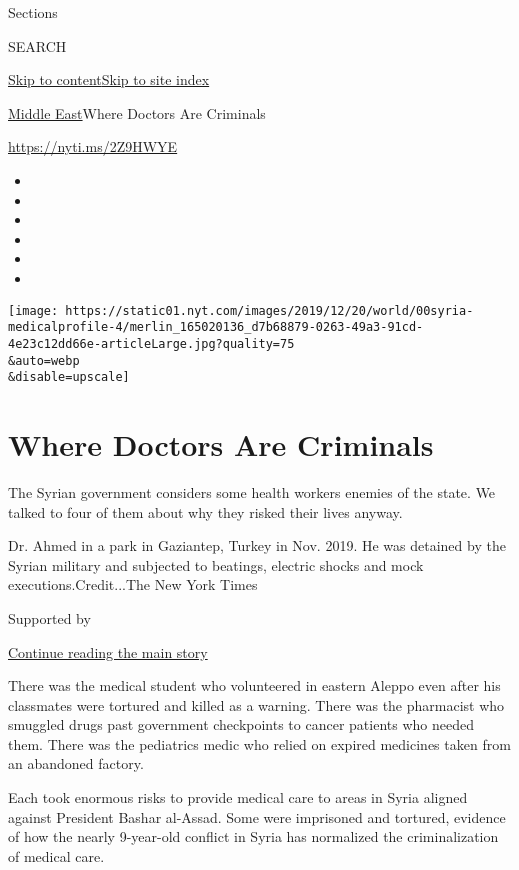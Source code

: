 Sections

SEARCH

\protect\hyperlink{site-content}{Skip to
content}\protect\hyperlink{site-index}{Skip to site index}

\href{/section/world/middleeast}{Middle East}\textbar{}Where Doctors Are
Criminals

\href{https://nyti.ms/2Z9HWYE}{https://nyti.ms/2Z9HWYE}

\begin{itemize}
\item
\item
\item
\item
\item
\item
\end{itemize}

\texttt{[image: https://static01.nyt.com/images/2019/12/20/world/00syria-medicalprofile-4/merlin\_165020136\_d7b68879-0263-49a3-91cd-4e23c12dd66e-articleLarge.jpg?quality=75\\\&auto=webp\\\&disable=upscale]}

\hypertarget{where-doctors-are-criminals}{%
\section{Where Doctors Are
Criminals}\label{where-doctors-are-criminals}}

The Syrian government considers some health workers enemies of the
state. We talked to four of them about why they risked their lives
anyway.

Dr. Ahmed in a park in Gaziantep, Turkey in Nov. 2019. He was detained
by the Syrian military and subjected to beatings, electric shocks and
mock executions.Credit...The New York Times

Supported by

\protect\hyperlink{after-sponsor}{Continue reading the main story}

There was the medical student who volunteered in eastern Aleppo even
after his classmates were tortured and killed as a warning. There was
the pharmacist who smuggled drugs past government checkpoints to cancer
patients who needed them. There was the pediatrics medic who relied on
expired medicines taken from an abandoned factory.

Each took enormous risks to provide medical care to areas in Syria
aligned against President Bashar al-Assad. Some were imprisoned and
tortured, evidence of how the nearly 9-year-old conflict in Syria has
normalized the criminalization of medical care.

